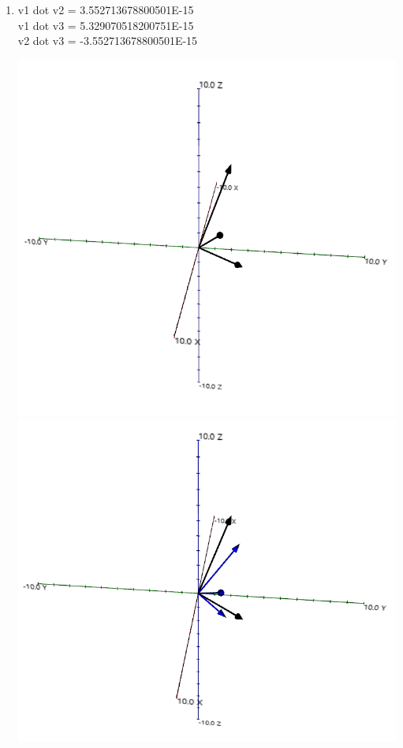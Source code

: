 \documentclass{article}
\begin{document}
\begin{enumerate}
\item 	
	v1 dot v2 = 3.552713678800501E-15\\
	v1 dot v3 = 5.329070518200751E-15\\
	v2 dot v3 = -3.552713678800501E-15
	
\includegraphics[scale=0.4]{module7_exercise27}\\
\includegraphics[scale=0.4]{module7_exercise27_b}



\end{enumerate}
\end{document}
